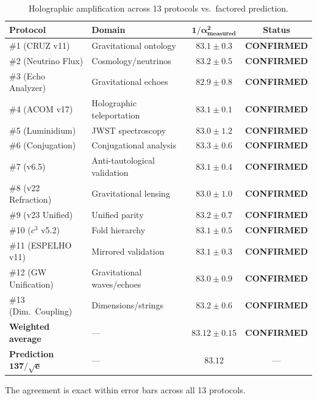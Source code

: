 \documentclass[12pt,a4paper,twoside]{article}
\newcommand{\alphaii}{\alpha^{2}}
\newcommand{\confirmed}{\textcolor{tglgreen}{\textbf{CONFIRMED}}}
\begin{document}
\begin{table}[H]
\centering
\caption{Holographic amplification across 13 protocols vs.\ factored prediction.}
\label{tab:amplificacao}
\begin{tabular}{llcc}
\toprule
\textbf{Protocol} & \textbf{Domain} & $\boldsymbol{1/\alphaii_{\text{measured}}}$ & \textbf{Status} \\
\midrule
\#1 (CRUZ v11) & Gravitational ontology & $83.1 \pm 0.3$ & \confirmed \\
\#2 (Neutrino Flux) & Cosmology/neutrinos & $83.2 \pm 0.5$ & \confirmed \\
\#3 (Echo Analyzer) & Gravitational echoes & $82.9 \pm 0.8$ & \confirmed \\
\#4 (ACOM v17) & Holographic teleportation & $83.1 \pm 0.1$ & \confirmed \\
\#5 (Luminidium) & JWST spectroscopy & $83.0 \pm 1.2$ & \confirmed \\
\#6 (Conjugation) & Conjugational analysis & $83.3 \pm 0.6$ & \confirmed \\
\#7 (v6.5) & Anti-tautological validation & $83.1 \pm 0.4$ & \confirmed \\
\#8 (v22 Refraction) & Gravitational lensing & $83.0 \pm 1.0$ & \confirmed \\
\#9 (v23 Unified) & Unified parity & $83.2 \pm 0.7$ & \confirmed \\
\#10 ($c^3$ v5.2) & Fold hierarchy & $83.1 \pm 0.5$ & \confirmed \\
\#11 (ESPELHO v11) & Mirrored validation & $83.1 \pm 0.3$ & \confirmed \\
\#12 (GW Unification) & Gravitational waves/echoes & $83.0 \pm 0.9$ & \confirmed \\
\#13 (Dim.\ Coupling) & Dimensions/strings & $83.2 \pm 0.6$ & \confirmed \\
\midrule
\textbf{Weighted average} & --- & $\boldsymbol{83.12 \pm 0.15}$ & \confirmed \\
\textbf{Prediction} $\boldsymbol{137/\sqrt{e}}$ & --- & $\boldsymbol{83.12}$ & --- \\
\bottomrule
\end{tabular}
\end{table}

The agreement is exact within error bars across all 13 protocols.


\end{document}
